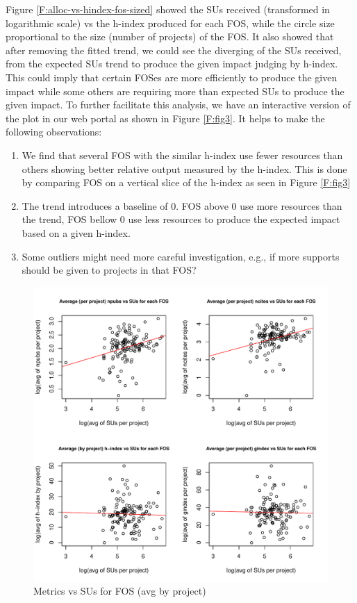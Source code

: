 Figure \ref{F:alloc-vs-hindex-fos-sized} showed the SUs received (transformed in logarithmic scale) vs the h-index produced for each FOS, while the circle size proportional to the size (number of projects) of the FOS. It also showed that after removing the fitted trend, we could see the diverging of the SUs received, from the expected SUs trend to produce the given impact judging by h-index. This could imply that certain FOSes are more efficiently to produce the given impact while some others are requiring more than expected SUs to produce the given impact. To further facilitate this analysis, we have an interactive version of the plot in our web portal as shown in Figure \ref{F:fig3}. It helps to make the following observations:

\begin{enumerate}

\item We find that several FOS with the similar h-index use fewer resources than others showing better relative output measured by the h-index. This is done by comparing FOS on a vertical slice of the h-index as seen in Figure \ref{F:fig3}

\item The trend introduces a baseline of 0. FOS above 0 use more resources than the trend, FOS bellow 0 use less resources to produce the expected impact based on a given h-index.

\item Some outliers might need more careful investigation, e.g., if more supports should be given to projects in that FOS?

\end{enumerate}

\begin{figure}[htb]
  \centering
    \includegraphics[width=1.0\columnwidth]{images/08_metrics_vs_alloc_avg_log_fit.pdf}
  \caption{Metrics vs SUs for FOS (avg by project)}\label{F:metrics-vs-alloc-avg-log-fit}
\end{figure}

